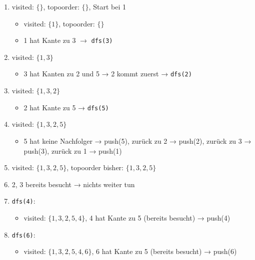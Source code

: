 \begin{enumerate}
	\item visited: $\{\}$, topoorder: $\{\}$, Start bei 1
	
	\begin{itemize}
		\item visited: $\{1\}$, topoorder: $\{\}$
		\item 1 hat Kante zu 3 $\rightarrow$ \texttt{dfs(3)}
	\end{itemize}
	
	\item visited: $\{1,3\}$
	
	\begin{itemize}
		\item 3 hat Kanten zu 2 und 5 → 2 kommt zuerst → \texttt{dfs(2)}
	\end{itemize}
	
	\item visited: $\{1,3,2\}$
	
	\begin{itemize}
		\item 2 hat Kante zu 5 → \texttt{dfs(5)}
	\end{itemize}
	
	\item visited: $\{1,3,2,5\}$
	
	\begin{itemize}
		\item 5 hat keine Nachfolger → push(5), zurück zu 2 → push(2), zurück zu 3 → push(3), zurück zu 1 → push(1)
	\end{itemize}
	
	\item visited: $\{1,3,2,5\}$, topoorder bisher: $\{1,3,2,5\}$
	
	\item 2, 3 bereits besucht → nichts weiter tun
	
	\item \texttt{dfs(4)}:
	
	\begin{itemize}
		\item visited: $\{1,3,2,5,4\}$, 4 hat Kante zu 5 (bereits besucht) → push(4)
	\end{itemize}
	
	\item \texttt{dfs(6)}:
	
	\begin{itemize}
		\item visited: $\{1,3,2,5,4,6\}$, 6 hat Kante zu 5 (bereits besucht) → push(6)
	\end{itemize}
	
\end{enumerate}

